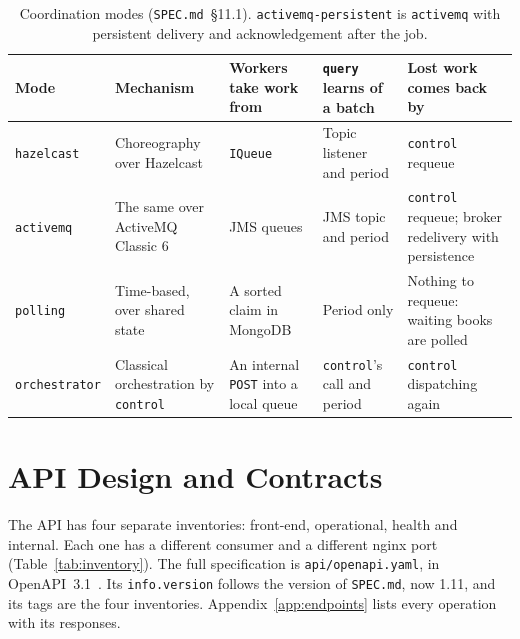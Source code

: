 \documentclass[11pt,a4paper]{article}
\newcommand{\code}[1]{\nolinkurl{#1}}
\newcommand{\mode}[1]{\code{#1}}
\newcommand{\spec}[1]{\code{SPEC.md}~\S#1}
\begin{document}
\begin{table}[ht]
\centering
\small
\caption{Coordination modes (\spec{11.1}). \mode{activemq-persistent} is \mode{activemq} with persistent delivery and
acknowledgement after the job.}
\label{tab:modes}
\begin{tabularx}{\textwidth}{@{}L{2.55cm}L{3.1cm}L{3.15cm}L{2.9cm}Y@{}}
\toprule
Mode & Mechanism & Workers take work from & \code{query} learns of a batch & Lost work comes back by \\
\midrule
\mode{hazelcast} & Choreography over Hazelcast & \code{IQueue} & Topic listener and period & \code{control} requeue \\
\mode{activemq} & The same over ActiveMQ Classic 6 & JMS queues & JMS topic and period & \code{control} requeue; broker redelivery with persistence \\
\mode{polling} & Time-based, over shared state & A sorted claim in MongoDB & Period only & Nothing to requeue: waiting books are polled \\
\mode{orchestrator} & Classical orchestration by \code{control} & An internal \code{POST} into a local queue & \code{control}'s call and period & \code{control} dispatching again \\
\bottomrule
\end{tabularx}
\end{table}
\section{API Design and Contracts}
\label{sec:api}

The API has four separate inventories: front-end, operational, health and internal. Each one has a different consumer
and a different nginx port (Table~\ref{tab:inventory}). The full specification is \code{api/openapi.yaml}, in
OpenAPI~3.1~\cite{openapi}. Its \code{info.version} follows the version of \code{SPEC.md}, now 1.11, and its tags are the four
inventories. Appendix~\ref{app:endpoints} lists every operation with its responses.
\end{document}
